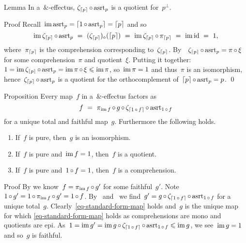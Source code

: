 \documentclass[b]{subfiles}
\begin{document}
\begin{parsec}%
\begin{point}{Lemma}%
    In a~$\&$-effectus,
    $\zeta_{\left\lceil p\right\rceil} \mathop{\circ} \mathrm{asrt}_p$
    is a quotient for~$p^\perp$.
\begin{point}{Proof}%
Recall~$\operatorname{im} \mathrm{asrt}_p = \left\lceil1 \mathop{\circ} \mathrm{asrt}_p\right\rceil = \left\lceil p\right\rceil$ and so
\begin{equation*}
\operatorname{im} \zeta_{\left\lceil p\right\rceil} \mathop{\circ} \mathrm{asrt}_p
\ =\  (\zeta_{\left\lceil p\right\rceil})_\diamond( \left\lceil p\right\rceil)
\ =\  \operatorname{im} \zeta_{\left\lceil p\right\rceil} \mathop{\circ} \pi_{\left\lceil p\right\rceil}
\ =\  \operatorname{im} \operatorname{id} \ =\  1,
\end{equation*}
where~$\pi_{\left\lceil p\right\rceil}$ is the comprehension corresponding to~$\zeta_{\left\lceil p\right\rceil}$.
By~~$\zeta_{\left\lceil p\right\rceil} \mathop{\circ} \mathrm{asrt}_p = \pi \mathop{\circ} \xi$
    for some comprehension~$\pi$ and quotient~$\xi$.
Putting it together:
$1 = \operatorname{im} \zeta_{\left\lceil p\right\rceil} \mathop{\circ} \mathrm{asrt}_p = \operatorname{im} \pi \mathop{\circ} \xi \leqslant \operatorname{im} \pi$,
so~$\operatorname{im} \pi = 1$ and thus~$\pi$ is an isomorphism,
hence~$\zeta_{\left\lceil p\right\rceil}\mathop{\circ} \mathrm{asrt}_p$
is a quotient for the orthocomplement of~$\left\lceil p\right\rceil \mathop{\circ} \mathrm{asrt}_p = p$. \qed
\end{point}
\end{point}
\begin{point}{Proposition}%
Every map~$f$
in a~$\&$-effectus
factors as
\begin{equation}\label{eq-standard-form-map}
        f \ =\ \pi_{\operatorname{im} f} \mathop{\circ} g \mathop{\circ} \zeta_{\left\lceil1 \mathop{\circ} f\right\rceil} \mathop{\circ} \mathrm{asrt}_{1 \mathop{\circ} f} 
    \end{equation}
    for a unique total and faithful map~$g$.
Furthermore the following holds.
\begin{enumerate}
\item
If~$f$ is pure, then~$g$ is an isomorphism.
\item
If~$f$ is pure and~$\operatorname{im} f = 1$, then~$f$ is a quotient.
\item
If~$f$ is pure and~$1 \mathop{\circ} f = 1$, then~$f$ is a comprehension.
\end{enumerate}
\begin{point}{Proof}%
By 
we know~$f = \pi_{\operatorname{im} f} \mathop{\circ} g'$
for some faithful~$g'$.
Note~$1 \mathop{\circ} g' = 1 \mathop{\circ} \pi_{\operatorname{im} f} \mathop{\circ} g' = 1 \mathop{\circ} f$.
By~ and~
we find~$g' = g \mathop{\circ} \zeta_{\left\lceil1 \mathop{\circ} f\right\rceil} \mathop{\circ} \mathrm{asrt}_{1 \mathop{\circ} f}$
for a unique total~$g$.
Clearly~\eqref{eq-standard-form-map} holds
and~$g$ is the unique map
    for which \eqref{eq-standard-form-map} holds
    as  comprehensions are mono and quotients are epi.
    As~$1 = \operatorname{im} g' = \operatorname{im} g \mathop{\circ} \zeta_{\left\lceil1 \mathop{\circ} f\right\rceil}
            \mathop{\circ} \mathrm{asrt}_{1 \mathop{\circ} f} \leqslant \operatorname{im} g$,
            we see~$\operatorname{im} g = 1$ and so~$g$ is faithful.


\end{point}
\end{point}
\end{parsec}
\end{document}
